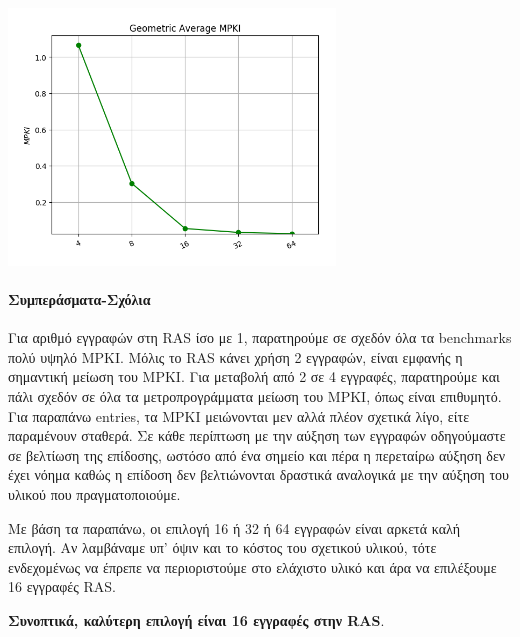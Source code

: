    \begin{minipage}{\textwidth}
      \begin{center}
         \\
         \vspace{3mm}
         \includegraphics[width=0.65\textwidth, frame]{./graphs/4-4/mean.png}
         \vspace{6mm}
      \end{center}
   \end{minipage}

\paragraph{Συμπεράσματα-Σχόλια}
   

   Για αριθμό εγγραφών στη RAS ίσο με 1, παρατηρούμε σε σχεδόν όλα τα benchmarks
   πολύ υψηλό MPKI. Μόλις το RAS κάνει χρήση 2 εγγραφών, είναι εμφανής η
   σημαντική μείωση του MPKI. Για μεταβολή από 2 σε 4 εγγραφές, παρατηρούμε και
   πάλι σχεδόν σε όλα τα μετροπρογράμματα μείωση του MPKI, όπως είναι επιθυμητό.
   Για παραπάνω entries, τα MPKI μειώνονται μεν αλλά πλέον σχετικά λίγο, είτε
   παραμένουν σταθερά. Σε κάθε περίπτωση με την αύξηση των εγγραφών οδηγούμαστε
   σε βελτίωση της επίδοσης, ωστόσο από ένα σημείο και πέρα η περεταίρω αύξηση
   δεν έχει νόημα καθώς η επίδοση δεν βελτιώνονται δραστικά αναλογικά με την
   αύξηση του υλικού που πραγματοποιούμε. 

   Με βάση τα παραπάνω, οι επιλογή 16 ή 32 ή 64 εγγραφών είναι αρκετά καλή
   επιλογή. Αν λαμβάναμε υπ’ όψιν και το κόστος του σχετικού υλικού, τότε
   ενδεχομένως να έπρεπε να περιοριστούμε στο ελάχιστο υλικό και άρα να
   επιλέξουμε 16 εγγραφές RAS.
   
   \textbf{Συνοπτικά, καλύτερη επιλογή είναι 16 εγγραφές στην RAS}.